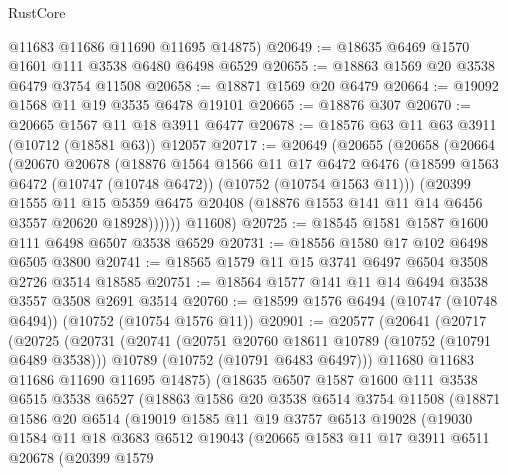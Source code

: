 \begin{lexlean}{RustCore}
\begin{coremodule}
      @11683
      @11686
      @11690
      @11695
      @14875)
@20649 := @18635 @6469 @1570 @1601 @111 @3538 @6480 @6498 @6529
@20655 := @18863 @1569 @20 @3538 @6479 @3754 @11508
@20658 := @18871 @1569 @20 @6479
@20664 := @19092 @1568 @11 @19 @3535 @6478 @19101
@20665 := @18876 @307
@20670 := @20665 @1567 @11 @18 @3911 @6477
@20678 := @18576 @63 @11 @63 @3911 (@10712 (@18581 @63)) @12057
@20717 := @20649
    (@20655
      (@20658
        (@20664
          (@20670
            @20678
            (@18876
              @1564
              @1566
              @11
              @17
              @6472
              @6476
              (@18599 @1563 @6472 (@10747 (@10748 @6472)) (@10752 (@10754 @1563 @11)))
              (@20399
                @1555
                @11
                @15
                @5359
                @6475
                @20408
                (@18876 @1553 @141 @11 @14 @6456 @3557 @20620 @18928))))))
      @11608)
@20725 := @18545 @1581 @1587 @1600 @111 @6498 @6507 @3538 @6529
@20731 := @18556 @1580 @17 @102 @6498 @6505 @3800
@20741 := @18565 @1579 @11 @15 @3741 @6497 @6504 @3508 @2726 @3514 @18585
@20751 := @18564 @1577 @141 @11 @14 @6494 @3538 @3557 @3508 @2691 @3514
@20760 := @18599 @1576 @6494 (@10747 (@10748 @6494)) (@10752 (@10754 @1576 @11))
@20901 := @20577
    (@20641
      (@20717
        (@20725
          (@20731
            (@20741
              (@20751 @20760 @18611 @10789 (@10752 (@10791 @6489 @3538)))
              @10789
              (@10752 (@10791 @6483 @6497)))
            @11680
            @11683
            @11686
            @11690
            @11695
            @14875)
          (@18635
            @6507
            @1587
            @1600
            @111
            @3538
            @6515
            @3538
            @6527
            (@18863
              @1586
              @20
              @3538
              @6514
              @3754
              @11508
              (@18871
                @1586
                @20
                @6514
                (@19019
                  @1585
                  @11
                  @19
                  @3757
                  @6513
                  @19028
                  (@19030
                    @1584
                    @11
                    @18
                    @3683
                    @6512
                    @19043
                    (@20665
                      @1583
                      @11
                      @17
                      @3911
                      @6511
                      @20678
                      (@20399
                        @1579

\end{coremodule}
\end{lexlean}

